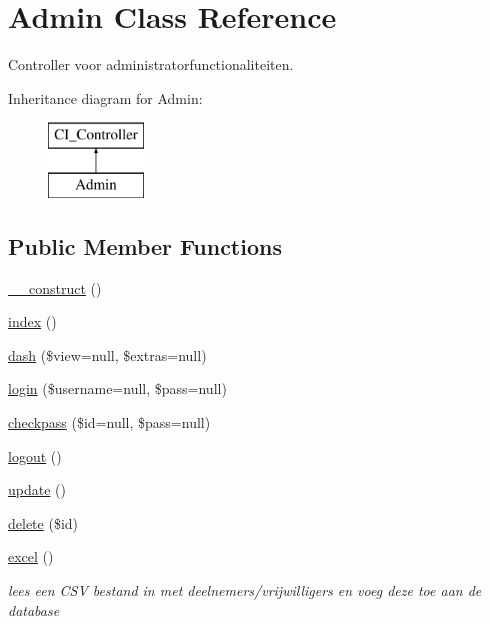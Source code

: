 \hypertarget{class_admin}{}\section{Admin Class Reference}
\label{class_admin}


Controller voor administratorfunctionaliteiten.  


Inheritance diagram for Admin\+:\begin{figure}[H]
\begin{center}
\leavevmode
\includegraphics[height=2.000000cm]{class_admin}
\end{center}
\end{figure}
\subsection*{Public Member Functions}
\begin{DoxyCompactItemize}
\item 
\mbox{\hyperlink{class_admin_a14eb545baec47d1bccb823fdcea061d4}{\+\_\+\+\_\+construct}} ()
\item 
\mbox{\hyperlink{class_admin_ae7187e96036e6bd23086e02b936b214a}{index}} ()
\item 
\mbox{\hyperlink{class_admin_a7c5b27650e2fd63227f09ece49beb2e9}{dash}} (\$view=null, \$extras=null)
\item 
\mbox{\hyperlink{class_admin_ae84deedea35076345e2e892ea0d60413}{login}} (\$username=null, \$pass=null)
\item 
\mbox{\hyperlink{class_admin_a3a644a6067cccdf84a5649a7777c1197}{checkpass}} (\$id=null, \$pass=null)
\item 
\mbox{\hyperlink{class_admin_ac008e1e771793cdd2b8223eec46061ae}{logout}} ()
\item 
\mbox{\hyperlink{class_admin_a5c7b585615c86fd80fe4b2dd8e282da0}{update}} ()
\item 
\mbox{\hyperlink{class_admin_af559704017572a72fef6280a651e1245}{delete}} (\$id)
\item 
\mbox{\label{class_admin_a6f3af7077b5bdaee0e8d4b43c0af9094}} 
\mbox{\hyperlink{class_admin_a6f3af7077b5bdaee0e8d4b43c0af9094}{excel}} ()
\begin{DoxyCompactList}\small\item\em lees een C\+SV bestand in met deelnemers/vrijwilligers en voeg deze toe aan de database \end{DoxyCompactList}\end{DoxyCompactItemize}


